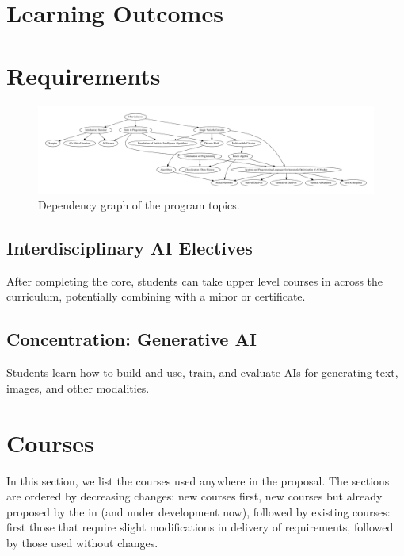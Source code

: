 \documentclass[
10pt, %
a4paper, %
oneside, %
headinclude,footinclude, %
BCOR5mm, %
]{scrartcl}
\begin{document}



\section{Learning Outcomes}



\section{Requirements}

\begin{figure}

  \includegraphics[width=1.0\linewidth]{dependency_graph/all}
  \caption{Dependency graph of the program topics.}
\end{figure}


  

\subsection{Interdisciplinary AI Electives}

After completing the core, students can take upper level courses in \ai{} across the curriculum, potentially combining with a minor or certificate.



\subsection{Concentration: Generative AI}

    Students learn how to build and use, train, and evaluate AIs for generating text, images, and other modalities.

  


  \section{Courses}

In this section, we list the courses used anywhere in the proposal.  The sections are ordered by decreasing changes: new courses first, new courses but already proposed by the  in  (and under development now), followed by existing courses: first those that require slight modifications in delivery of requirements, followed by those used without changes.  
\end{document}
